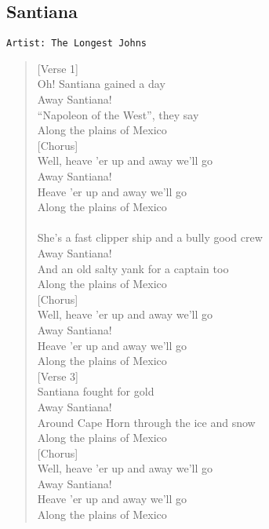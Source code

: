 \documentclass[11pt]{article}
\begin{document}
\subsection{Santiana}
\label{sec:org3ce6f03}
\begin{verbatim}
Artist: The Longest Johns
\end{verbatim}
\begin{verse}
[Verse 1]\\
Oh! Santiana gained a day\\
Away Santiana!\\
``Napoleon of the West'', they say\\
Along the plains of Mexico\\
\vspace*{1em}
[Chorus]\\
Well, heave 'er up and away we'll go\\
Away Santiana!\\
Heave 'er up and away we'll go\\
Along the plains of Mexico\\
[Verse 2]\\
She's a fast clipper ship and a bully good crew\\
Away Santiana!\\
And an old salty yank for a captain too\\
Along the plains of Mexico\\
\vspace*{1em}
[Chorus]\\
Well, heave 'er up and away we'll go\\
Away Santiana!\\
Heave 'er up and away we'll go\\
Along the plains of Mexico\\
\vspace*{1em}
[Verse 3]\\
Santiana fought for gold\\
Away Santiana!\\
Around Cape Horn through the ice and snow\\
Along the plains of Mexico\\
\vspace*{1em}
[Chorus]\\
Well, heave 'er up and away we'll go\\
Away Santiana!\\
Heave 'er up and away we'll go\\
Along the plains of Mexico\\

\end{verse}
\end{document}

